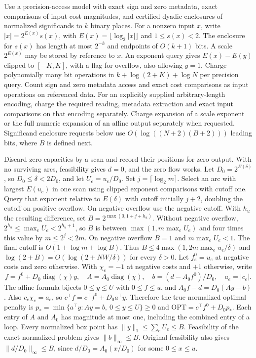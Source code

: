 \documentclass[11pt]{article}
\begin{document}
Use a precision-access model with exact sign and zero metadata, exact comparisons of input cost magnitudes, and certified dyadic enclosures of normalized significands to \(k\) binary places. For a nonzero input \(x\), write \(|x|=2^{E(x)}s(x)\), with \(E(x)=\lfloor\log_2|x|\rfloor\) and \(1\le s(x)<2\). The enclosure for \(s(x)\) has length at most \(2^{-k}\) and endpoints of \(O(k+1)\) bits. A scale \(2^{E(x)}\) may be stored by reference to \(x\). An exponent query gives \(E(x)-E(y)\) clipped to \([-K,K]\), with a flag for overflow, also allowing \(y=1\). Charge polynomially many bit operations in \(k+\log(2+K)+\log N\) per precision query. Count sign and zero metadata access and exact cost comparisons as input operations on referenced data. For an explicitly supplied arbitrary-length encoding, charge the required reading, metadata extraction and exact input comparisons on that encoding separately. Charge expansion of a scale exponent or the full numeric expansion of an affine output separately when requested. Significand enclosure requests below use \(O(\log((N+2)(B+2)))\) leading bits, where \(B\) is defined next.

Discard zero capacities by a scan and record their positions for zero output. With no surviving arcs, feasibility gives \(d=0\), and the zero flow works. Let \(D_0=2^{E(\delta)}\), so \(D_0\le\delta<2D_0\), and let \(U_e=u_e/D_0\). Set \(j=\lceil\log_2m\rceil\). Select an arc with largest \(E(u_e)\) in one scan using clipped exponent comparisons with cutoff one. Query that exponent relative to \(E(\delta)\) with cutoff initially \(j+2\), doubling the cutoff on positive overflow. On negative overflow use the negative cutoff. With \(h_u\) the resulting difference, set \(B=2^{\max(0,1+j+h_u)}\). Without negative overflow, \(2^{h_u}\le\max_e U_e<2^{h_u+1}\), so \(B\) is between \(\max(1,m\max_e U_e)\) and four times this value by \(m\le 2^j<2m\). On negative overflow \(B=1\) and \(m\max_e U_e<1\). The final cutoff is \(O(1+\log m+\log B)\). Thus \(B\le4\max(1,2m\max_e u_e/\delta)\) and \(\log(2+B)=O(\log(2+NW/\delta))\) for every \(\delta>0\). Let \(f^0_e=u_e\) at negative costs and zero otherwise. With \(\chi_e=-1\) at negative costs and \(+1\) otherwise, write
\[
 f=f^0+D_0\operatorname{diag}(\chi)y,\quad
 A=A_0\operatorname{diag}(\chi),\quad b=(d-A_0 f^0)/D_0,\quad
 a_e=|c_e|.
\]
The affine formula bijects \(0\le y\le U\) with \(0\le f\le u\), and \(A_0f-d=D_0(Ay-b)\). Also \(c_e\chi_e=a_e\), so \(c^\top f=c^\top f^0+D_0a^\top y\). Therefore the true normalized optimal penalty is \(p_*=\min\{a^\top y:Ay=b,\ 0\le y\le U\}\ge0\) and \(\mathrm{OPT}=c^\top f^0+D_0p_*\). Each entry of \(A\) and \(A_0\) has magnitude at most one, including the combined entry of a loop. Every normalized box point has \(\|y\|_1\le\sum_e U_e\le B\). Feasibility of the exact normalized problem gives \(\|b\|_\infty\le B\). Original feasibility also gives \(\|d/D_0\|_\infty\le B\), since \(d/D_0=A_0(x/D_0)\) for some \(0\le x\le u\).
\end{document}
